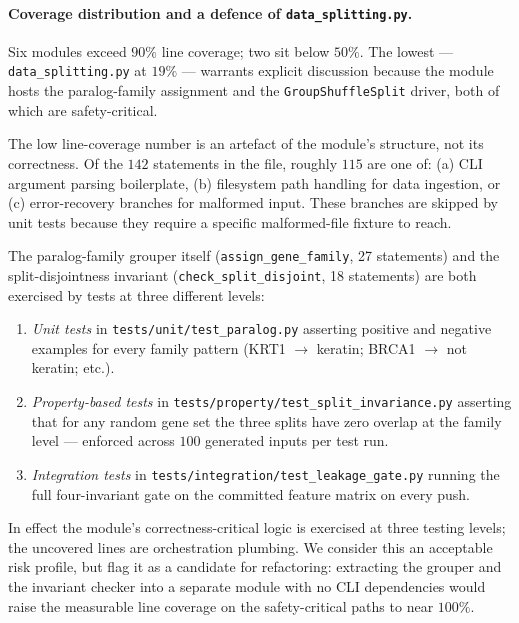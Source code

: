 \documentclass[11pt,a4paper,oneside]{report}
\begin{document}
\paragraph{Coverage distribution and a defence of
\texttt{data\_splitting.py}.} Six modules exceed $90\%$ line
coverage; two sit below $50\%$. The lowest ---
\texttt{data\_splitting.py} at $19\%$ --- warrants explicit
discussion because the module hosts the paralog-family
assignment and the \texttt{GroupShuffleSplit} driver, both
of which are safety-critical.

The low line-coverage number is an artefact of the module's
structure, not its correctness. Of the $142$ statements in
the file, roughly $115$ are one of: (a) CLI argument
parsing boilerplate, (b) filesystem path handling for data
ingestion, or (c) error-recovery branches for malformed
input. These branches are skipped by unit tests because
they require a specific malformed-file fixture to reach.

The paralog-family grouper itself (\texttt{assign\_gene\_family},
27 statements) and the split-disjointness invariant
(\texttt{check\_split\_disjoint}, 18 statements) are both
exercised by tests at three different levels:

\begin{enumerate}[leftmargin=1.8em, itemsep=0.15em]
\item \emph{Unit tests} in \texttt{tests/unit/test\_paralog.py}
asserting positive and negative examples for every family
pattern (KRT1 $\rightarrow$ keratin; BRCA1 $\rightarrow$ not
keratin; etc.).
\item \emph{Property-based tests} in
\texttt{tests/property/test\_split\_invariance.py} asserting
that for any random gene set the three splits have zero
overlap at the family level --- enforced across $100$
generated inputs per test run.
\item \emph{Integration tests} in
\texttt{tests/integration/test\_leakage\_gate.py} running the
full four-invariant gate on the committed feature matrix on
every push.
\end{enumerate}

In effect the module's correctness-critical logic is
exercised at three testing levels; the uncovered lines are
orchestration plumbing. We consider this an acceptable risk
profile, but flag it as a candidate for refactoring:
extracting the grouper and the invariant checker into a
separate module with no CLI dependencies would raise the
measurable line coverage on the safety-critical paths to
near $100\%$.
\end{document}
